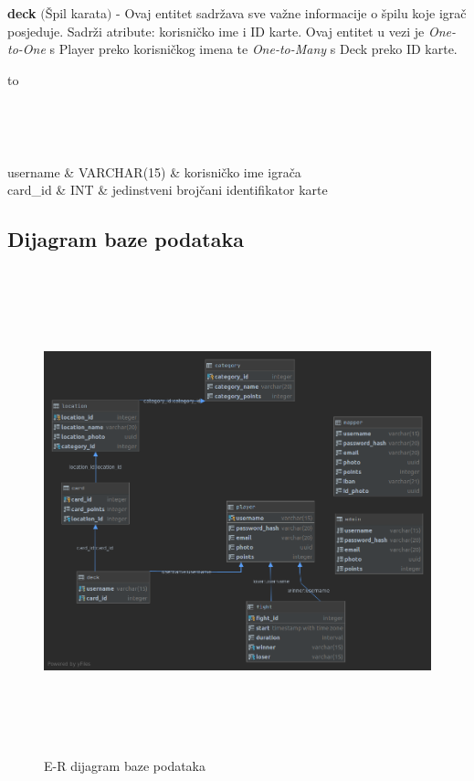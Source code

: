 				{\noindent\textbf{deck} $($Špil karata$)$ - Ovaj entitet sadržava sve važne informacije o špilu koje igrač posjeduje. Sadrži atribute: korisničko ime i ID karte. Ovaj entitet u vezi je \textit{One-to-One} s Player preko korisničkog imena te \textit{One-to-Many} s Deck preko ID karte.}
				
				\begin{longtabu} to \textwidth {|X[6, l]|X[7, l]|X[20, l]|}
					
					\hline {}	 \\[3pt] \hline
					\endfirsthead
					
					\hline {}	 \\[3pt] \hline
					\endhead
					
					\hline 
					\endlastfoot
					
					username & VARCHAR(15)	&   korisničko ime igrača	\\ \hline
					 card\_id	& INT &   jedinstveni brojčani identifikator karte	\\ \hline 
					
					
				\end{longtabu}
			
			
			\subsection{Dijagram baze podataka}
				\begin{figure}[H]
					\includegraphics[width=\linewidth, height=14cm]{dijagrami/geofighterdb_diagram}				
					\centering
					\caption{E-R dijagram baze podataka}
					\label{}
				\end{figure}
			

